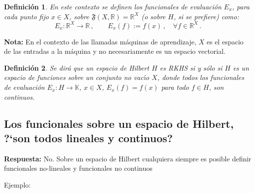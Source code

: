 \documentclass[12pt,reqno]{amsart}
\newtheorem*{mydef}{Definici\'on}
\begin{document}
\begin{mydef}
En este contexto se definen los funcionales de evaluaci\'on $E_x$,
para cada punto fijo $x\in X$, sobre
$\mathfrak{F}(X,\mathbb{R})=\mathbb{R}^X$
(o sobre $H$, si se prefiere) como:
$$
E_x: \mathbb{R}^X\to\mathbb{R}\,,\qquad
E_x(f):=f(x)\,,\quad\forall f\in \mathbb{R}^X\,.
$$
\end{mydef}

\textbf{Nota:} En el contexto de las llamadas m\'aquinas de aprendizaje, $X$ es
el espacio de las entradas a la m\'aquina y no necesariamente es un espacio
vectorial.

\begin{mydef}
Se dir\'a que un espacio de Hilbert $H$ es RKHS si y s\'olo si
$H$ es un espacio de funciones sobre un conjunto no vac\'\i o $X$, donde
todos los funcionales de evaluaci\'on $E_x:H\to\mathbb{K}$, $x\in X$, 
$E_x(f)=f(x)$ para todo $f\in H$, son continuos.
\end{mydef}

\subsection*{Los funcionales sobre un espacio de Hilbert, ?`son todos lineales y continuos?}


\textbf{Respuesta:} No. Sobre un espacio de Hilbert cualquiera siempre es posible definir funcionales no-lineales y funcionales no continuos


Ejemplo:
\end{document}
